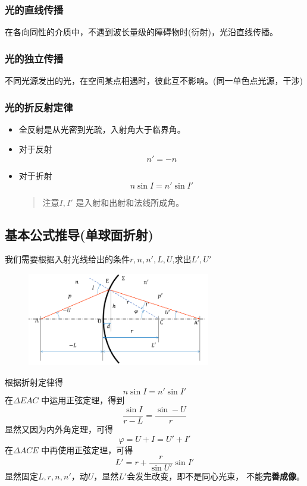 \subsubsection{光的直线传播} 在各向同性的介质中，不遇到波长量级的障碍物时(衍射)，光沿直线传播。
\subsubsection{光的独立传播} 不同光源发出的光，在空间某点相遇时，彼此互不影响。(同一单色点光源，干涉)
\subsubsection{光的折反射定律}
\begin{itemize}
\item 全反射是从光密到光疏，入射角大于临界角。
\item 对于反射
$$ n'=-n
$$
\item 对于折射
$$
n\sin I=n'\sin I'
$$
\begin{quote}
{\qquad{}\ccwd\kaishu{}
注意$I,I'$ 是入射和出射和法线所成角。
}
\end{quote}
\end{itemize}
\subsection{基本公式推导(单球面折射)}
我们需要根据入射光线给出的条件$r,n,n',L,U$,求出$L',U'$
\begin{figure}[H]
    \centering
    \includegraphics[width=8cm]{img/1.1.png}
\end{figure}
根据折射定律得
\begin{equation}
    n \sin I =n' \sin I '\tag{1.2.1.a}
\end{equation}
在$\Delta EAC$ 中运用正弦定理，得到
\begin{equation}
    \frac{\sin I }{r-L}=\frac{\sin -U}{r}\tag{1.2.2.a}
\end{equation}
显然又因为内外角定理，可得
\begin{equation}
    \varphi=U+I=U'+I' \tag{1.2.3.a}
\end{equation}
在$\Delta ACE$ 中再使用正弦定理，可得
\begin{equation}
    L'=r+\frac{r}{\sin U'} \sin I' \tag{1.2.4.a}
\end{equation}
显然固定$L,r,n,n'$，动$U$，显然$L'$会发生改变，即不是同心光束，
不能\textbf{完善成像}。
